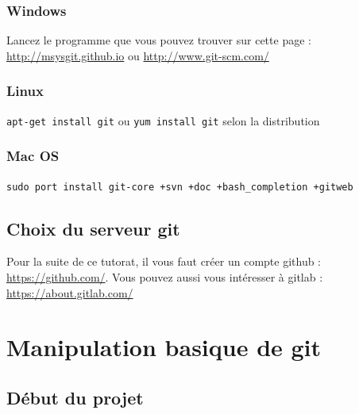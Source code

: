 \documentclass[a4paper,10pt]{report}
\begin{document}
    \subsection{Windows}
Lancez le programme que vous pouvez trouver sur cette page : \url{http://msysgit.github.io} ou \url{http://www.git-scm.com/}
    \subsection{Linux}
\verb|apt-get install git| ou \verb|yum install git| selon la distribution
    \subsection{Mac OS}
\verb|sudo port install git-core +svn +doc +bash_completion +gitweb|
  \section{Choix du serveur git}
Pour la suite de ce tutorat, il vous faut créer un compte github : \url{https://github.com/}.
Vous pouvez aussi vous intéresser à gitlab : \url{https://about.gitlab.com/}

\chapter{Manipulation basique de git}
  \section{D\'ebut du projet}
\end{document}

